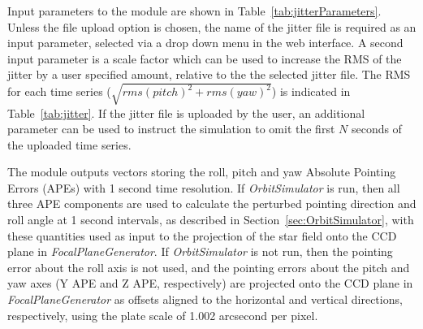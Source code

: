 \documentclass[11pt]{article}      %
\begin{document}
Input parameters to the module are shown in Table~\ref{tab:jitterParameters}. Unless the file upload option is chosen, the name of the jitter file is required as an input parameter, selected via a drop down menu in the web interface.  A second input parameter is a scale factor which can be used to increase the RMS of the jitter by a user specified amount, relative to the the selected jitter file. The RMS for each time series ($\sqrt{rms(pitch)^2+rms(yaw)^2}$) is indicated in Table~\ref{tab:jitter}. If the jitter file is uploaded by the user, an additional parameter can be used to instruct the simulation to omit the first $N$ seconds of the uploaded time series.

The module outputs vectors storing the roll, pitch and yaw Absolute Pointing Errors (APEs) with 1 second time resolution. If {\it OrbitSimulator} is run, then all three APE components are used to calculate the perturbed pointing direction and roll angle at 1 second intervals, as described in Section~\ref{sec:OrbitSimulator}, with these quantities used as input to the projection of the star field onto the CCD plane in {\it FocalPlaneGenerator}. If {\it OrbitSimulator} is not run, then the pointing error about the roll axis is not used, and the pointing errors about the pitch and yaw axes (Y APE and Z APE, respectively) are projected onto the CCD plane in {\it FocalPlaneGenerator} as offsets aligned to the horizontal and vertical directions, respectively, using the plate scale of 1.002 arcsecond per pixel.
\end{document}
